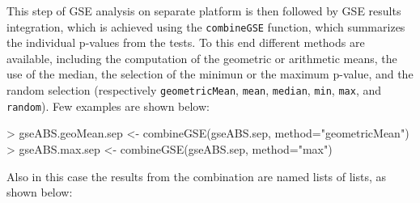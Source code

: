 \documentclass[11pt]{article}
\newcommand{\Rfunction}[1]{{\texttt{#1}}}
\newcommand{\Rfunarg}[1]{{\texttt{#1}}}
\begin{document}
This step of GSE analysis on separate platform is then followed 
by GSE results integration, which is achieved using the 
\Rfunction{combineGSE} function, which summarizes the
individual p-values from the  tests.
To this end different methods are available, including the computation
of the geometric or arithmetic  means, the use of the median, 
the selection of the minimun or the maximum p-value, and
the random selection (respectively \Rfunarg{geometricMean},
\Rfunarg{mean}, \Rfunarg{median}, \Rfunarg{min}, \Rfunarg{max},
and \Rfunarg{random}). Few examples are shown below:

\begin{Schunk}
\begin{Sinput}
> gseABS.geoMean.sep <- combineGSE(gseABS.sep, method="geometricMean")
> gseABS.max.sep <- combineGSE(gseABS.sep, method="max")
\end{Sinput}
\end{Schunk}

Also in this case the results from the combination are named lists of lists,
as shown below:
\end{document}
